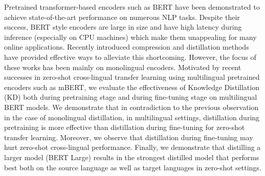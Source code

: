 Pretrained transformer-based encoders such as BERT have been demonstrated to achieve state-of-the-art performance on numerous NLP tasks. Despite their success, BERT style encoders are large in size and have high latency during inference (especially on CPU machines) which make them unappealing for many online applications. Recently introduced compression and distillation methods have provided effective ways to alleviate this shortcoming. However, the focus of these works has been mainly on monolingual encoders. Motivated by recent successes in zero-shot cross-lingual transfer learning using multilingual pretrained encoders such as mBERT, we evaluate the effectiveness of Knowledge Distillation (KD) both during pretraining stage and during fine-tuning stage on multilingual BERT models. We demonstrate that in contradiction to the previous observation in the case of monolingual distillation, in multilingual settings, distillation during pretraining is more effective than distillation during fine-tuning for zero-shot transfer learning. Moreover, we observe that distillation during fine-tuning may hurt zero-shot cross-lingual performance. Finally,  we demonstrate that distilling a larger model (BERT Large) results in the strongest distilled model that performs best both on the source language as well as target languages in zero-shot settings.
